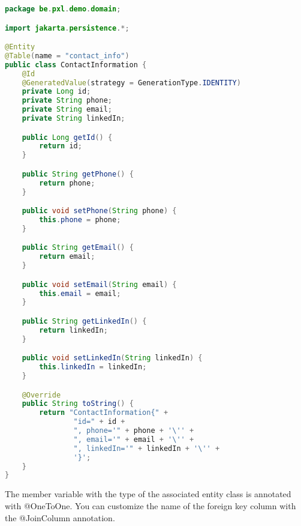 \begin{lstlisting}[frame=single, language=java]
package be.pxl.demo.domain;

import jakarta.persistence.*;

@Entity
@Table(name = "contact_info")
public class ContactInformation {
    @Id
    @GeneratedValue(strategy = GenerationType.IDENTITY)
    private Long id;
    private String phone;
    private String email;
    private String linkedIn;

    public Long getId() {
        return id;
    }

    public String getPhone() {
        return phone;
    }

    public void setPhone(String phone) {
        this.phone = phone;
    }

    public String getEmail() {
        return email;
    }

    public void setEmail(String email) {
        this.email = email;
    }

    public String getLinkedIn() {
        return linkedIn;
    }

    public void setLinkedIn(String linkedIn) {
        this.linkedIn = linkedIn;
    }

    @Override
    public String toString() {
        return "ContactInformation{" +
                "id=" + id +
                ", phone='" + phone + '\'' +
                ", email='" + email + '\'' +
                ", linkedIn='" + linkedIn + '\'' +
                '}';
    }
}
\end{lstlisting}

The member variable with the type of the associated entity class is annotated with @OneToOne. You can customize the name of the foreign key column with the @JoinColumn annotation.

